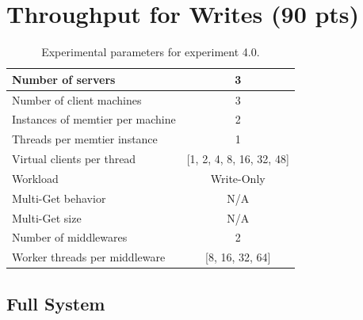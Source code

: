 \section{Throughput for Writes (90 pts)\label{sec:4}}

    \begin{table}
        \scriptsize{
            \begin{tabular}{|l|c|}
                \hline Number of servers                & 3 \\
                \hline Number of client machines        & 3 \\
                \hline Instances of memtier per machine & 2 \\
                \hline Threads per memtier instance     & 1 \\
                \hline Virtual clients per thread       & [1, 2, 4, 8, 16, 32, 48] \\
                \hline Workload                         & Write-Only \\
                \hline Multi-Get behavior               & N/A \\
                \hline Multi-Get size                   & N/A \\
                \hline Number of middlewares            & 2 \\
                \hline Worker threads per middleware    & [8, 16, 32, 64]  \\
                \hline
            \end{tabular}
            \caption{Experimental parameters for experiment 4.0.\label{tab:40_setup}}
        }
    \end{table}

    \subsection{Full System\label{subsec:4_full-system}}

